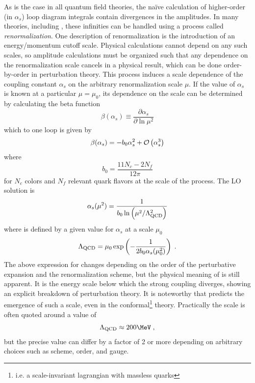 
As is the case in all quantum field theories, the na\"ive calculation of higher-order (in $\alpha_s$) loop diagram integrals contain divergences in the amplitudes.
In many theories, including \qcd \cite{Gross:1973ju}, these infinities can be handled using a process called \emph{renormalization}.
One description of renormalization is the introduction of an energy/momentum cutoff scale.
Physical calculations cannot depend on any such scales, so amplitude calculations must be organized such that any dependence on the renormalization scale cancels in a physical result, which can be done order-by-order in perturbation theory.
This process induces a scale dependence of the coupling constant $\alpha_s$ on the arbitrary renormalization scale $\mu$.
If the value of $\alpha_s$ is known at a particular $\mu = \mu_0$, its dependence on the scale can be determined by calculating the beta function
\begin{equation}
  \beta(\alpha_s) \equiv  \frac{\partial \alpha_s}{\partial \ln \mu^2}
\end{equation}
which to one loop is given by \cite{Gross:1973id}
\begin{equation}
  \beta(\alpha_s) = -b_0 \alpha_s^2 + \mathcal{O}\left( \alpha_s^3 \right)
\end{equation}
where
\[
b_0 = \frac{11 N_c - 2 N_f}{12\pi}
\]
for $N_c$ colors and $N_f$ relevant quark flavors at the scale of the process.
The \ac{LO} solution is
\begin{equation}
  \alpha_s(\mu^2) = \frac{1}{b_0 \ln\left(\mu^2 / \Lambda_\textrm{QCD}^2\right)}
  \label{eq:running_as}
\end{equation}
where \lqcd is defined by a given value for $\alpha_s$ at a scale $\mu_0$
\[
\Lambda_\textrm{QCD} = \mu_0 \exp \left( -\frac{1}{2 b_0 \alpha_s(\mu_0^2)} \right) \; .
\]
The above expression for \lqcd changes depending on the order of the perturbative expansion and the renormalization scheme, but the physical meaning of \lqcd is still apparent.
It is the energy scale below which the strong coupling diverges, showing an explicit breakdown of perturbation theory.
It is noteworthy that \qcd predicts the emergence of such a scale, even in the conformal\footnote{i.e. a scale-invariant lagrangian with massless quarks} theory.
Practically the \qcd scale is often quoted around a value of %
\[
\lqcd \approx 200 \MeV \;,
\]
but the precise value can differ by a factor of 2 or more depending on arbitrary choices such as scheme, order, and gauge.

